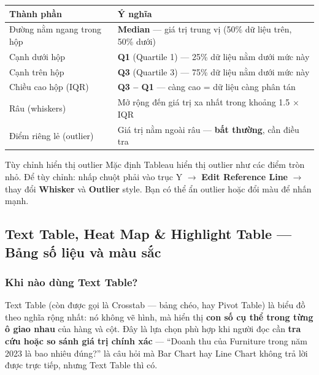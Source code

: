 \documentclass[12pt]{article}
\begin{document}
\begin{center}
\renewcommand{\arraystretch}{1.4}
\begin{tabularx}{\linewidth}{l X}
\toprule
\textbf{Thành phần} & \textbf{Ý nghĩa} \\
\midrule
Đường nằm ngang trong hộp & \textbf{Median} --- giá trị trung vị (50\% dữ liệu trên, 50\% dưới) \\
Cạnh dưới hộp & \textbf{Q1} (Quartile 1) --- 25\% dữ liệu nằm dưới mức này \\
Cạnh trên hộp & \textbf{Q3} (Quartile 3) --- 75\% dữ liệu nằm dưới mức này \\
Chiều cao hộp (IQR) & \textbf{Q3 -- Q1} --- càng cao = dữ liệu càng phân tán \\
Râu (whiskers) & Mở rộng đến giá trị xa nhất trong khoảng 1.5 $\times$ IQR \\
Điểm riêng lẻ (outlier) & Giá trị nằm ngoài râu --- \textbf{bất thường}, cần điều tra \\
\bottomrule
\end{tabularx}
\end{center}

\begin{guidelinebox}{Tùy chỉnh hiển thị outlier}
Mặc định Tableau hiển thị outlier như các điểm tròn nhỏ. Để tùy chỉnh: nhấp chuột phải vào trục Y $\rightarrow$ \textbf{Edit Reference Line} $\rightarrow$ thay đổi \textbf{Whisker} và \textbf{Outlier} style. Bạn có thể ẩn outlier hoặc đổi màu để nhấn mạnh.
\end{guidelinebox}

\subsection{Text Table, Heat Map \& Highlight Table --- Bảng số liệu và màu sắc}

\subsubsection{Khi nào dùng Text Table?}

\noindent Text Table (còn được gọi là Crosstab --- bảng chéo, hay Pivot Table) là biểu đồ theo nghĩa rộng nhất: nó không vẽ hình, mà hiển thị \textbf{con số cụ thể trong từng ô giao nhau} của hàng và cột. Đây là lựa chọn phù hợp khi người đọc cần \textbf{tra cứu hoặc so sánh giá trị chính xác} --- ``Doanh thu của Furniture trong năm 2023 là bao nhiêu đúng?'' là câu hỏi mà Bar Chart hay Line Chart không trả lời được trực tiếp, nhưng Text Table thì có.
\end{document}
